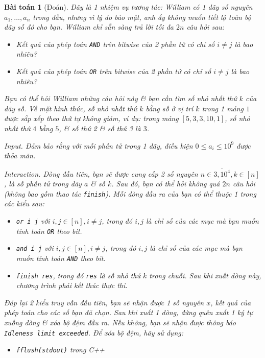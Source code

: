 \documentclass{article}
\newtheorem{baitoan}{Bài toán}
\begin{document}
\begin{baitoan}[Đoán]
    Đây là 1 nhiệm vụ tương tác: {\sc William} có 1 dãy số nguyên $a_1,\ldots,a_n$ trong đầu, nhưng vì lý do bảo mật, anh ấy không muốn tiết lộ toàn bộ dãy số đó cho bạn. {\sc William} chỉ sẵn sàng trả lời tối đa $2n$ câu hỏi sau:

    \begin{itemize}
        \item Kết quả của phép toán {\tt AND} trên bitwise của 2 phần tử có chỉ số $i\ne j$ là bao nhiêu?
        \item Kết quả của phép toán {\tt OR} trên bitwise của 2 phần tử có chỉ số $i\ne j$ là bao nhiêu?
    \end{itemize}
    Bạn có thể hỏi {\sc William} những câu hỏi này \& bạn cần tìm số nhỏ nhất thứ $k$ của dãy số. Về mặt hình thức, số nhỏ nhất thứ $k$ bằng số ở vị trí $k$ trong 1 mảng $1$ được sắp xếp theo thứ tự không giảm, ví dụ: trong mảng $[5,3,3,10,1]$, số nhỏ nhất thứ $4$ bằng $5$, \& số thứ 2 \& số thứ 3 là $3$.
    \item {\sf Input.} Đảm bảo rằng với mỗi phần tử trong 1 dãy, điều kiện $0\le a_i\le10^9$ được thỏa mãn.
    \item {\sf Interaction.} Dòng đầu tiên, bạn sẽ được cung cấp 2 số nguyên $n\in\overline{3,10^4},k\in[n]$, là số phần tử trong dãy $a$ \& số $k$. Sau đó, bạn có thể hỏi không quá $2n$ câu hỏi (không bao gồm thao tác {\tt finish}). Mỗi dòng đầu ra của bạn có thể thuộc 1 trong các kiểu sau:
    \begin{itemize}
        \item {\tt or i j} với $i,j\in[n],i\ne j$, trong đó $i,j$ là chỉ số của các mục mà bạn muốn tính toán {\tt OR} theo bit.
        \item {\tt and i j} với $i,j\in[n],i\ne j$, trong đó $i,j$ là chỉ số của các mục mà bạn muốn tính toán {\tt AND} theo bit.
        \item {\tt finish res}, trong đó {\tt res} là số nhỏ thứ $k$ trong chuỗi. Sau khi xuất dòng này, chương trình phải kết thúc thực thi.
    \end{itemize}
    Đáp lại 2 kiểu truy vấn đầu tiên, bạn sẽ nhận được 1 số nguyên $x$, kết quả của phép toán cho các số bạn đã chọn. Sau khi xuất 1 dòng, đừng quên xuất 1 ký tự xuống dòng \& xóa bộ đệm đầu ra. Nếu không, bạn sẽ nhận được thông báo {\tt Idleness limit exceeded}. Để xóa bộ đệm, hãy sử dụng:
    \begin{itemize}
        \item {\tt fflush(stdout)} trong C++

\end{itemize}
\end{baitoan}
\end{document}

